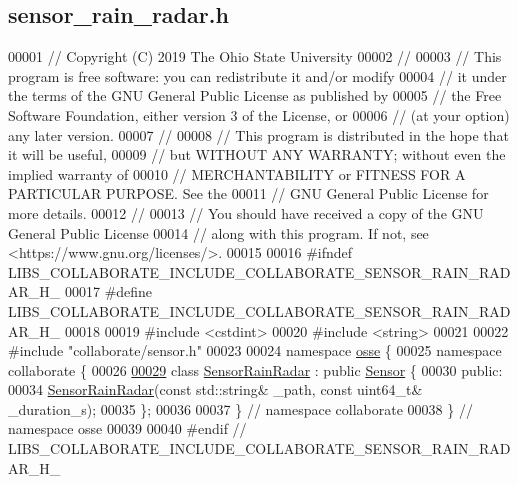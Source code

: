 \hypertarget{sensor__rain__radar_8h_source}{}\subsection{sensor\+\_\+rain\+\_\+radar.\+h}
\label{sensor__rain__radar_8h_source}

\begin{DoxyCode}
00001 \textcolor{comment}{// Copyright (C) 2019 The Ohio State University}
00002 \textcolor{comment}{//}
00003 \textcolor{comment}{// This program is free software: you can redistribute it and/or modify}
00004 \textcolor{comment}{// it under the terms of the GNU General Public License as published by}
00005 \textcolor{comment}{// the Free Software Foundation, either version 3 of the License, or}
00006 \textcolor{comment}{// (at your option) any later version.}
00007 \textcolor{comment}{//}
00008 \textcolor{comment}{// This program is distributed in the hope that it will be useful,}
00009 \textcolor{comment}{// but WITHOUT ANY WARRANTY; without even the implied warranty of}
00010 \textcolor{comment}{// MERCHANTABILITY or FITNESS FOR A PARTICULAR PURPOSE.  See the}
00011 \textcolor{comment}{// GNU General Public License for more details.}
00012 \textcolor{comment}{//}
00013 \textcolor{comment}{// You should have received a copy of the GNU General Public License}
00014 \textcolor{comment}{// along with this program.  If not, see <https://www.gnu.org/licenses/>.}
00015 
00016 \textcolor{preprocessor}{#ifndef LIBS\_COLLABORATE\_INCLUDE\_COLLABORATE\_SENSOR\_RAIN\_RADAR\_H\_}
00017 \textcolor{preprocessor}{#define LIBS\_COLLABORATE\_INCLUDE\_COLLABORATE\_SENSOR\_RAIN\_RADAR\_H\_}
00018 
00019 \textcolor{preprocessor}{#include <cstdint>}
00020 \textcolor{preprocessor}{#include <string>}
00021 
00022 \textcolor{preprocessor}{#include "collaborate/sensor.h"}
00023 
00024 \textcolor{keyword}{namespace }\hyperlink{namespaceosse}{osse} \{
00025 \textcolor{keyword}{namespace }collaborate \{
00026 
\hyperlink{classosse_1_1collaborate_1_1_sensor_rain_radar}{00029} \textcolor{keyword}{class }\hyperlink{classosse_1_1collaborate_1_1_sensor_rain_radar}{SensorRainRadar} : \textcolor{keyword}{public} \hyperlink{classosse_1_1collaborate_1_1_sensor}{Sensor} \{
00030  \textcolor{keyword}{public}:
00034   \hyperlink{classosse_1_1collaborate_1_1_sensor_rain_radar_af454a12a4cfea3b84b9c0901c9088e2d}{SensorRainRadar}(\textcolor{keyword}{const} std::string& \_path, \textcolor{keyword}{const} uint64\_t& \_duration\_s);
00035 \};
00036 
00037 \}  \textcolor{comment}{// namespace collaborate}
00038 \}  \textcolor{comment}{// namespace osse}
00039 
00040 \textcolor{preprocessor}{#endif  // LIBS\_COLLABORATE\_INCLUDE\_COLLABORATE\_SENSOR\_RAIN\_RADAR\_H\_}
\end{DoxyCode}

